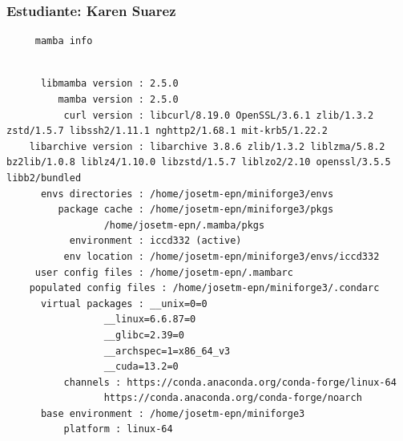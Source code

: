 \documentclass{article}
\begin{document}
\subsubsection{Estudiante: Karen Suarez}
\label{sec:org8f99f28}

\begin{verbatim}
     mamba info
\end{verbatim}

\begin{verbatim}

	  libmamba version : 2.5.0
	     mamba version : 2.5.0
	      curl version : libcurl/8.19.0 OpenSSL/3.6.1 zlib/1.3.2 zstd/1.5.7 libssh2/1.11.1 nghttp2/1.68.1 mit-krb5/1.22.2
	libarchive version : libarchive 3.8.6 zlib/1.3.2 liblzma/5.8.2 bz2lib/1.0.8 liblz4/1.10.0 libzstd/1.5.7 liblzo2/2.10 openssl/3.5.5 libb2/bundled
	  envs directories : /home/josetm-epn/miniforge3/envs
	     package cache : /home/josetm-epn/miniforge3/pkgs
			     /home/josetm-epn/.mamba/pkgs
	       environment : iccd332 (active)
	      env location : /home/josetm-epn/miniforge3/envs/iccd332
	 user config files : /home/josetm-epn/.mambarc
    populated config files : /home/josetm-epn/miniforge3/.condarc
	  virtual packages : __unix=0=0
			     __linux=6.6.87=0
			     __glibc=2.39=0
			     __archspec=1=x86_64_v3
			     __cuda=13.2=0
		  channels : https://conda.anaconda.org/conda-forge/linux-64
			     https://conda.anaconda.org/conda-forge/noarch
	  base environment : /home/josetm-epn/miniforge3
		  platform : linux-64
\end{verbatim}
\end{document}
